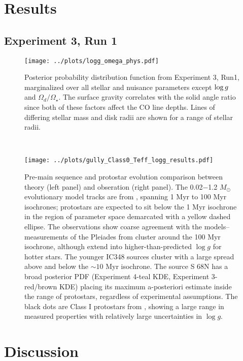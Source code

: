 \documentclass[twocolumn]{emulateapj}%
\begin{document}
\section{Results}

\subsection{Experiment 3, Run 1}


\begin{figure}
 \centering
 \texttt{[image: ../plots/logg\_omega\_phys.pdf]}
 \caption{Posterior probability distribution function from Experiment 3, Run1, marginalized over all stellar and nuisance parameters except $\log g$ and $\Omega_d/\Omega_\star$.  The surface gravity correlates with the solid angle ratio since both of these factors affect the CO line depths.  Lines of differing stellar mass and disk radii are shown for a range of stellar radii.}
 \label{fig:posterior_loggOmega}
\end{figure}


~\clearpage

\begin{figure*}[b]
 \centering
 \texttt{[image: ../plots/gully\_Class0\_Teff\_logg\_results.pdf]}
 \caption{Pre-main sequence and protostar evolution comparison between theory (left panel) and obseration (right panel).  The 0.02$-$1.2 $M_{\odot}$ evolutionary model tracks are from \citet{baraffe15}, spanning 1 Myr to 100 Myr isochrones; protostars are expected to sit below the 1 Myr isochrone in the region of parameter space demarcated with a yellow dashed ellipse.  The observations show coarse agreement with the models-- measurements of the Pleiades from \citet[green KDE]{cottaar14} cluster around the 100 Myr isochrone, although extend into higher-than-predicted $\log{g}$ for hotter stars.  The younger IC348 sources \citep[purple KDE]{cottaar14} cluster with a large spread above and below the $\sim10$ Myr isochrone.  The source S 68N has a broad posterior PDF (Experiment 4-teal KDE, Experiment 3- red/brown KDE) placing its maximum a-posteriori estimate inside the range of protostars, regardless of experimental assumptions.  The black dots are Class I protostars from \citet{2005AJ....130.1145D}, showing a large range in measured properties with relatively large uncertainties in $\log{g}$.}  
 \label{fig:theory_v_obs}
\end{figure*}



\section{Discussion}
\end{document}
